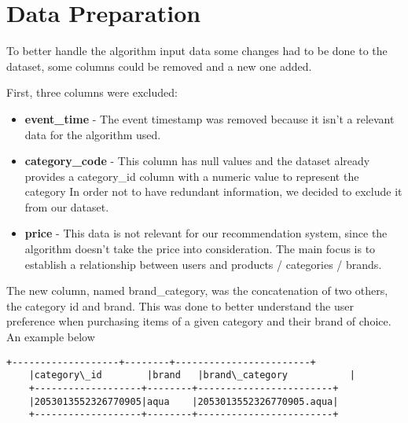 \section{Data Preparation}
\label{data_prep}

To better handle the algorithm input data some changes had to be done to the dataset,
some columns could be removed and a new one added.

First, three columns were excluded:
\begin{itemize}
    \item \textbf{event\_time} - The event timestamp was removed because it isn't a relevant data for the algorithm used.
    \item \textbf{category\_code} - This column has null values and the dataset already provides a category\_id column with a numeric value to represent the category
    In order not to have redundant information, we decided to exclude it from our dataset.
    \item \textbf{price} - This data is not relevant for our recommendation system, since the algorithm doesn't take the price into consideration.
    The main focus is to establish a relationship between users and products / categories / brands.
\end{itemize}

The new column, named brand\_category, was the concatenation of two others, the category id and brand. This was done to better 
understand the user preference when purchasing items of a given category and their brand of choice.
An example below

\begin{Verbatim}[commandchars=\\\{\}]
    +-------------------+--------+------------------------+
    |category\_id        |brand   |brand\_category           |
    +-------------------+--------+------------------------+
    |2053013552326770905|aqua    |2053013552326770905.aqua|
    +-------------------+--------+------------------------+
\end{Verbatim}


